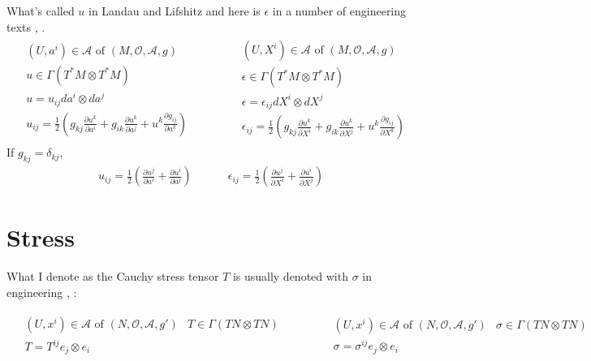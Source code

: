 \documentclass[twoside,landscape,10pt]{amsart}
\theoremstyle{plain}
\theoremstyle{definition}
\theoremstyle{remark}
\begin{document}
\begin{multicols*}{2}
What's called $u$ in Landau and Lifshitz \cite{LLandauELifshitz1970} and here is $\epsilon$ in a number of engineering texts \cite{PLagace2002}, \cite{RRadovitzky2003}.  
\[
\begin{gathered}
\begin{aligned} 
& (U,a^i) \in \mathcal{A} \text{ of } (M,\mathcal{O},\mathcal{A},g)  \\
  & u \in \Gamma(T^*M \otimes T^*M) \\
  & u = u_{ij} da^i \otimes da^j \\ 
  & u_{ij} = \frac{1}{2} ( g_{kj} \frac{ \partial u^k}{ \partial a^i} + g_{ik} \frac{ \partial u^k}{ \partial a^j} + u^k \frac{ \partial g_{ij}}{ \partial a^k} ) \end{aligned} \quad \quad \quad \, 
\begin{aligned}
& (U,X^i) \in \mathcal{A} \text{ of } (M,\mathcal{O},\mathcal{A},g)  \\
  & \epsilon \in \Gamma(T^*M \otimes T^*M) \\
  & \epsilon = \epsilon_{ij} dX^i \otimes dX^j \\ 
  & \epsilon_{ij} = \frac{1}{2} ( g_{kj} \frac{ \partial u^k}{ \partial X^i} + g_{ik} \frac{ \partial u^k}{ \partial X^j} + u^k \frac{ \partial g_{ij}}{ \partial X^k} ) 
\end{aligned} 
\end{gathered}
\]
If $g_{kj} = \delta_{kj}$, 
\[
\begin{gathered}
  u_{ij} = \frac{1}{2} \left( \frac{ \partial u^j}{ \partial a^i} + \frac{ \partial u^i}{ \partial a^j} \right)
\quad \quad \quad \,   \epsilon_{ij} = \frac{1}{2} \left( \frac{ \partial u^j}{ \partial X^i} + \frac{ \partial u^i}{ \partial X^j} \right)
\end{gathered}
\]

\section{Stress}

What I denote as the Cauchy stress tensor $T$ is usually denoted with $\sigma$ in engineering \cite{PLagace2002}, \cite{RRadovitzky2003}:

\[
\begin{gathered}
  \begin{aligned}
    & (U,x^i) \in \mathcal{A} \text{ of } (N, \mathcal{O}, \mathcal{A},g')
    & T \in \Gamma(TN \otimes TN) \\ 
    & T= T^{ij} e_j\otimes e_i
\end{aligned} \quad \quad \quad \, 
  \begin{aligned}
    & (U,x^i) \in \mathcal{A} \text{ of } (N, \mathcal{O}, \mathcal{A},g')
    & \sigma \in \Gamma(TN \otimes TN) \\ 
    & \sigma= \sigma^{ij} e_j\otimes e_i
\end{aligned}
\end{gathered}
\]



\end{multicols*}
\end{document}
